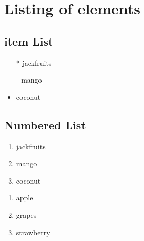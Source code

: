 \documentclass[12pt]{report}
\begin{document}
\section{Listing of elements}

\subsection{item List}

\begin{itemize}
\item[*] jackfruits
\item [-]mango
\item coconut
\end{itemize}
\subsection{Numbered List}

\begin{enumerate}[label=\alph*]
\item jackfruits
\item mango
\item coconut
\end{enumerate}


\begin{enumerate}[label=\alph*]
\item apple
\item grapes
\item strawberry
\end{enumerate}
\end{document}
